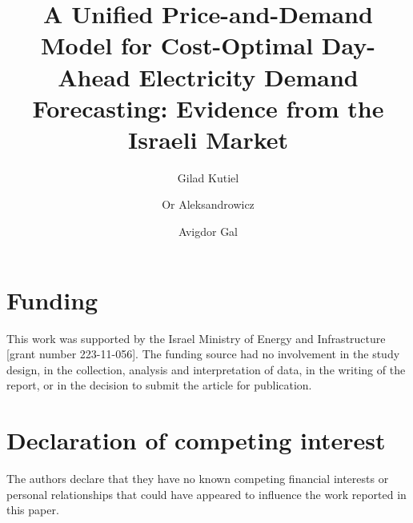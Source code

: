 \documentclass[preprint,12pt,authoryear]{elsarticle}
\begin{document}
\begin{frontmatter}

\title{A Unified Price-and-Demand Model for Cost-Optimal Day-Ahead
Electricity Demand Forecasting: Evidence from the Israeli Market}

\author{Gilad Kutiel}
\author{Or Aleksandrowicz}
\author{Avigdor Gal}
\address{Technion -- Israel Institute of Technology, Technion City, Haifa
3200003, Israel}

\end{frontmatter}

\section*{Funding}
This work was supported by the Israel Ministry of Energy and Infrastructure
[grant number 223-11-056].  The funding source had no involvement in the
study design, in the collection, analysis and interpretation of data, in the
writing of the report, or in the decision to submit the article for
publication.

\section*{Declaration of competing interest}
The authors declare that they have no known competing financial interests or
personal relationships that could have appeared to influence the work reported
in this paper.
\end{document}
